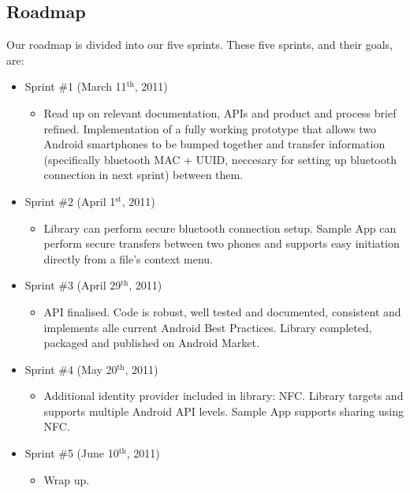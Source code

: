 \documentclass[a4paper,11pt]{article}
\begin{document}
\subsection{Roadmap} %
\label{subsec:roadmap}
Our roadmap is divided into our five sprints. These five sprints, and their goals, are:
\begin{itemize}
	\item Sprint \#1 (March 11$^{\text{th}}$, 2011)
	\begin{itemize}
		\item Read up on relevant documentation, APIs and product and process brief refined. Implementation of a fully working prototype that allows two Android smartphones to be bumped together and transfer information (specifically bluetooth MAC + UUID, neccesary for setting up bluetooth connection in next sprint) between them.
	\end{itemize}
\pagebreak
	\item Sprint \#2 (April 1$^{\text{st}}$, 2011)
	\begin{itemize}
		\item Library can perform secure bluetooth connection setup. Sample App can perform secure transfers between two phones and supports easy initiation directly from a file's context menu. 
	\end{itemize}
	
	\item Sprint \#3 (April 29$^{\text{th}}$, 2011)
	\begin{itemize}
		\item API finalised. Code is robust, well tested and documented, consistent and implements alle current Android Best Practices. Library completed, packaged and published on Android Market.
	\end{itemize}
	
	\item Sprint \#4 (May 20$^{\text{th}}$, 2011)
	\begin{itemize}
		\item Additional identity provider included in library: NFC. Library targets and supports multiple Android API levels. Sample App supports sharing using NFC.
	\end{itemize}
	
	\item Sprint \#5 (June 10$^{\text{th}}$, 2011)
	\begin{itemize}
		\item Wrap up.
	\end{itemize}
\end{itemize}
\end{document}
